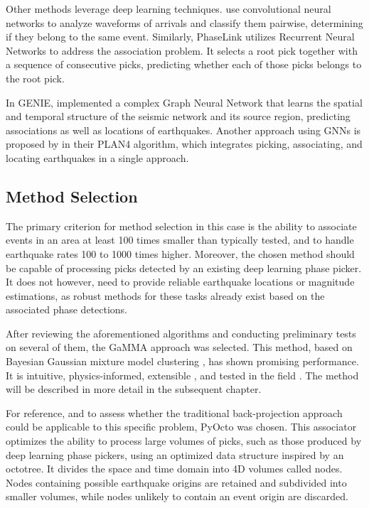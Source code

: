 \documentclass{scrreprt}
\begin{document}
Other methods leverage deep learning techniques. \citet{pairwise} use convolutional neural networks to analyze waveforms of arrivals and classify them pairwise, determining if they belong to the same event. Similarly, PhaseLink \citep{phaselink} utilizes Recurrent Neural Networks to address the association problem. It selects a root pick together with a sequence of consecutive picks, predicting whether each of those picks belongs to the root pick.

In GENIE, \citet{gnn} implemented a complex Graph Neural Network that learns the spatial and temporal structure of the seismic network and its source region, predicting associations as well as locations of earthquakes. Another approach using GNNs is proposed by \citet{plan4} in their PLAN4 algorithm, which integrates picking, associating, and locating earthquakes in a single approach.

\subsection{Method Selection}
The primary criterion for method selection in this case is the ability to associate events in an area at least 100 times smaller than typically tested, and to handle earthquake rates 100 to 1000 times higher. Moreover, the chosen method should be capable of processing picks detected by an existing deep learning phase picker. It does not however, need to provide reliable earthquake locations or magnitude estimations, as robust methods for these tasks already exist based on the associated phase detections.

After reviewing the aforementioned algorithms and conducting preliminary tests on several of them, the GaMMA approach \citep{gamma} was selected. This method, based on Bayesian Gaussian mixture model clustering \citep{bishop}, has shown promising performance. It is intuitive, physics-informed, extensible \citep{neuma}, and tested in the field \citep{quakeflow}. The method will be described in more detail in the subsequent chapter.

For reference, and to assess whether the traditional back-projection approach could be applicable to this specific problem, PyOcto \citep{pyocto} was chosen. This associator optimizes the ability to process large volumes of picks, such as those produced by deep learning phase pickers, using an optimized data structure inspired by an octotree. It divides the space and time domain into 4D volumes called nodes. Nodes containing possible earthquake origins are retained and subdivided into smaller volumes, while nodes unlikely to contain an event origin are discarded.
\end{document}
